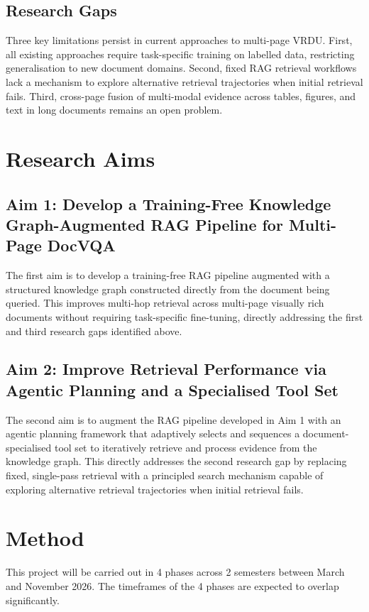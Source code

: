 \documentclass[12pt, a4paper]{article}
\begin{document}
\subsection*{Research Gaps}
Three key limitations persist in current approaches to multi-page VRDU. First, all existing approaches require task-specific training on labelled data, restricting generalisation to new document domains. Second, fixed RAG retrieval workflows lack a mechanism to explore alternative retrieval trajectories when initial retrieval fails. Third, cross-page fusion of multi-modal evidence across tables, figures, and text in long documents remains an open problem.

\section*{Research Aims}

\subsection*{Aim 1: Develop a Training-Free Knowledge Graph-Augmented RAG Pipeline for Multi-Page DocVQA}
The first aim is to develop a training-free RAG pipeline augmented with a structured knowledge graph constructed directly from the document being queried. This improves multi-hop retrieval across multi-page visually rich documents without requiring task-specific fine-tuning, directly addressing the first and third research gaps identified above.

\subsection*{Aim 2: Improve Retrieval Performance via Agentic Planning and a Specialised Tool Set}
The second aim is to augment the RAG pipeline developed in Aim 1 with an agentic planning framework that adaptively selects and sequences a document-specialised tool set to iteratively retrieve and process evidence from the knowledge graph. This directly addresses the second research gap by replacing fixed, single-pass retrieval with a principled search mechanism capable of exploring alternative retrieval trajectories when initial retrieval fails.
 
\section*{Method}
This project will be carried out in 4 phases across 2 semesters between March and November 2026. The timeframes of the 4 phases are expected to overlap significantly.
\end{document}
